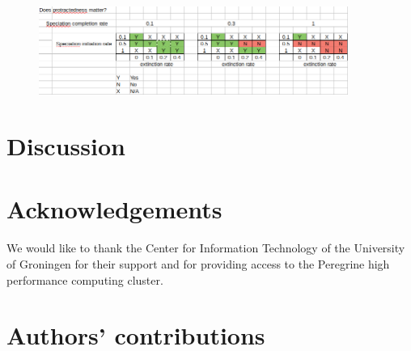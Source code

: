 \documentclass{article}
\begin{document}
\begin{figure}[]
  \includegraphics[width=0.9\textwidth]{fig_does_protractedness_matter.png}
\end{figure}

\section{Discussion}


\section{Acknowledgements}

We would like to thank the Center for Information Technology of the University of Groningen for their support
and for providing access to the Peregrine high performance computing cluster.

\section{Authors' contributions}



\end{document}
